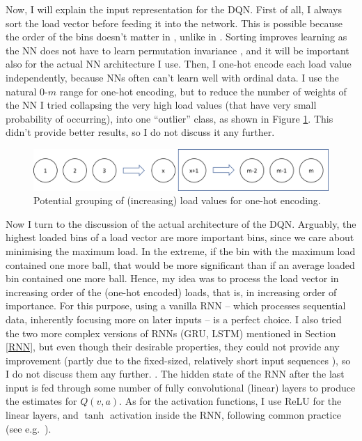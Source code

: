 Now, I will explain the input representation for the DQN. First of all, I always sort the load vector before feeding it into the network. This is possible because the order of the bins doesn't matter in \TwoThinning, unlike in \GraphicalTwoChoice. Sorting improves learning as the NN does not have to learn permutation invariance \cite{zaheer2017permutationinvariance}, and it will be important also for the actual NN architecture I use. Then, I one-hot encode each load value independently, because NNs often can't learn well with ordinal data. I use the natural $0$-$m$ range for one-hot encoding, but to reduce the number of weights of the NN I tried collapsing the very high load values (that have very small probability of occurring), into one ``outlier'' class, as shown in Figure \ref{NN-maxload}. This didn't provide better results, so I do not discuss it any further.


\begin{figure}[hbt!] \label{NN-maxload}
    \centering
    \includegraphics[scale=0.5]{Chapter2/Figs/NN_maxload.png}
    \caption{Potential grouping of (increasing) load values for one-hot encoding.}
\end{figure}


Now I turn to the discussion of the actual architecture of the DQN. Arguably, the highest loaded bins of a load vector are more important bins, since we care about minimising the maximum load. In the extreme, if the bin with the maximum load contained one more ball, that would be more significant than if an average loaded bin contained one more ball. Hence, my idea was to process the load vector in increasing order of the (one-hot encoded) loads, that is, in increasing order of importance. For this purpose, using a vanilla RNN -- which processes sequential data, inherently focusing more on later inputs -- is a perfect choice. I also tried the two more complex versions of RNNs (GRU, LSTM) mentioned in Section \ref{RNN}, but even though their desirable properties, they could not provide any improvement (partly due to the fixed-sized, relatively short input sequences ), so I do not discuss them any further. .
The hidden state of the RNN after the last input is fed through some number of fully convolutional (linear) layers to produce the estimates for $Q(v, a)$. As for the activation functions, I use ReLU for the linear layers, and $\tanh$ activation inside the RNN, following common practice (see e.g.\ \cite{szandala2020activationfunctions}).


